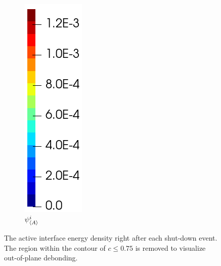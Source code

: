 \begin{figure}[!htb]
\begin{subfigure}{0.08\textwidth}
  \end{subfigure}
  \begin{subfigure}{0.1\textwidth}
    \centering
    \caption*{$\psi^i_{\left< A \right>}$}
    \includegraphics[width=\textwidth]{Chapter5/figures/spallation/colorbar_psii}
  \end{subfigure}
  \caption[The active interface energy density right after each shut-down event.]{The active interface energy density right after each shut-down event. The region within the contour of $c \leqslant 0.75$ is removed to visualize out-of-plane debonding.}
  \label{fig: Chapter5/spallation/animation_psii}
\end{figure}
